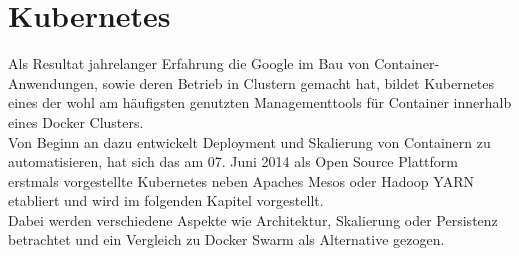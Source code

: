 \chapter{Kubernetes}
Als Resultat jahrelanger Erfahrung die Google im Bau von Container-Anwendungen, sowie deren Betrieb in Clustern gemacht hat, bildet Kubernetes eines der wohl am häufigsten genutzten Managementtools für Container innerhalb eines Docker Clusters.\\
Von Beginn an dazu entwickelt Deployment und Skalierung von Containern zu automatisieren, hat sich das am 07. Juni 2014 als Open Source Plattform erstmals vorgestellte Kubernetes neben Apaches Mesos oder Hadoop YARN etabliert und wird im folgenden Kapitel vorgestellt.\\
Dabei werden verschiedene Aspekte wie Architektur, Skalierung oder Persistenz betrachtet und ein Vergleich zu Docker Swarm als Alternative gezogen.


